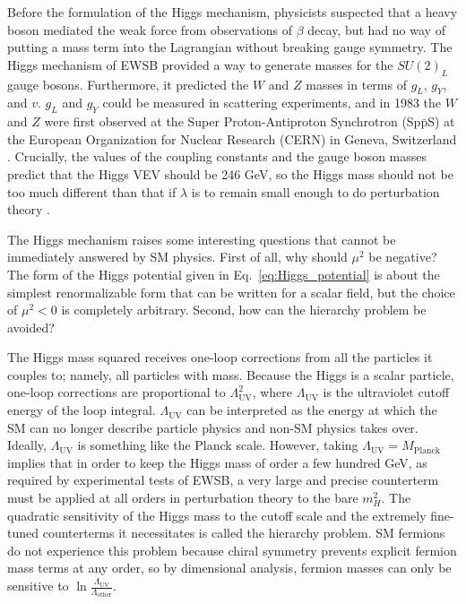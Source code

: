 \documentclass[dissertation.tex]{subfiles}
\begin{document}
Before the formulation of the Higgs mechanism, physicists suspected that a heavy boson mediated the weak force from observations of $\beta$ decay, but had no way of putting a mass term into the Lagrangian without breaking gauge symmetry.  The Higgs mechanism of EWSB provided a way to generate masses for the $SU(2)_{L}$ gauge bosons.  Furthermore, it predicted the $W$ and $Z$ masses in terms of $g_{L}$, $g_{Y}$, and $v$.  $g_{L}$ and $g_{Y}$ could be measured in scattering experiments, and in 1983 the $W$ and $Z$ were first observed at the Super Proton-Antiproton Synchrotron (Sp$\bar{\mbox{p}}$S) at the European Organization for Nuclear Research (CERN) in Geneva, Switzerland \cite{Arnison:1983rp,Arnison1983398}.  Crucially, the values of the coupling constants and the gauge boson masses predict that the Higgs VEV should be 246 GeV, so the Higgs mass should not be too much different than that if $\lambda$ is to remain small enough to do perturbation theory \cite{Gunion:425736}.

The Higgs mechanism raises some interesting questions that cannot be immediately answered by SM physics.  First of all, why should $\mu^{2}$ be negative?  The form of the Higgs potential given in Eq.~\ref{eq:Higgs_potential} is about the simplest renormalizable form that can be written for a scalar field, but the choice of $\mu^{2} < 0$ is completely arbitrary.  Second, how can the hierarchy problem be avoided?

The Higgs mass squared receives one-loop corrections from all the particles it couples to; namely, all particles with mass.  Because the Higgs is a scalar particle, one-loop corrections are proportional to $\Lambda_{\mathrm{UV}}^{2}$, where $\Lambda_{\mathrm{UV}}$ is the ultraviolet cutoff energy of the loop integral.  $\Lambda_{\mathrm{UV}}$ can be interpreted as the energy at which the SM can no longer describe particle physics and non-SM physics takes over.  Ideally, $\Lambda_{\mathrm{UV}}$ is something like the Planck scale.  However, taking $\Lambda_{\mathrm{UV}} = M_{\mathrm{Planck}}$ implies that in order to keep the Higgs mass of order a few hundred GeV, as required by experimental tests of EWSB, a very large and precise counterterm must be applied at all orders in perturbation theory to the bare $m_{H}^{2}$.  The quadratic sensitivity of the Higgs mass to the cutoff scale and the extremely fine-tuned counterterms it necessitates is called the hierarchy problem.  SM fermions do not experience this problem because chiral symmetry prevents explicit fermion mass terms at any order, so by dimensional analysis, fermion masses can only be sensitive to $\ln\frac{\Lambda_{\mathrm{UV}}}{\Lambda_{\mathrm{other}}}$.
\end{document}
